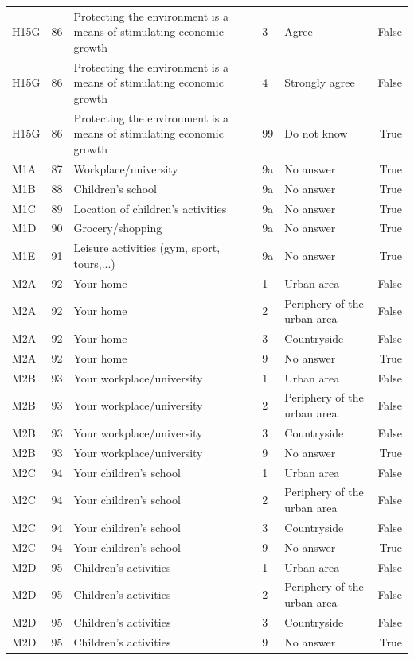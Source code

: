 \begin{tabular}{lrlllr}
H15G & 86 & Protecting the environment is a means of stimulating economic growth & 3 & Agree & False \\
H15G & 86 & Protecting the environment is a means of stimulating economic growth & 4 & Strongly agree & False \\
H15G & 86 & Protecting the environment is a means of stimulating economic growth & 99 & Do not know & True \\
M1A & 87 & Workplace/university & 9a & No answer & True \\
M1B & 88 & Children’s school & 9a & No answer & True \\
M1C & 89 & Location of children’s activities & 9a & No answer & True \\
M1D & 90 & Grocery/shopping & 9a & No answer & True \\
M1E & 91 & Leisure activities (gym, sport, tours,...) & 9a & No answer & True \\
M2A & 92 & Your home & 1 & Urban area & False \\
M2A & 92 & Your home & 2 & Periphery of the urban area & False \\
M2A & 92 & Your home & 3 & Countryside & False \\
M2A & 92 & Your home & 9 & No answer & True \\
M2B & 93 & Your workplace/university & 1 & Urban area & False \\
M2B & 93 & Your workplace/university & 2 & Periphery of the urban area & False \\
M2B & 93 & Your workplace/university & 3 & Countryside & False \\
M2B & 93 & Your workplace/university & 9 & No answer & True \\
M2C & 94 & Your children’s school & 1 & Urban area & False \\
M2C & 94 & Your children’s school & 2 & Periphery of the urban area & False \\
M2C & 94 & Your children’s school & 3 & Countryside & False \\
M2C & 94 & Your children’s school & 9 & No answer & True \\
M2D & 95 & Children’s activities & 1 & Urban area & False \\
M2D & 95 & Children’s activities & 2 & Periphery of the urban area & False \\
M2D & 95 & Children’s activities & 3 & Countryside & False \\
M2D & 95 & Children’s activities & 9 & No answer & True \\

\end{tabular}
